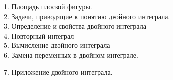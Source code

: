 1. Площадь плоской фигуры. \\



2. Задачи, приводящие к понятию двойного интеграла. \\



3. Определение и свойства двойного интеграла \\



4. Повторный интеграл \\



5. Вычисление двойного интеграла \\



6. Замена переменных в двойном интеграле.



7. Приложение двойного интеграла.





